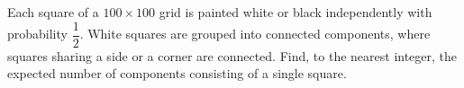 Each square of a $100\times100$ grid is painted white or black independently with probability $\dfrac12$. White squares are grouped into connected components, where squares sharing a side or a corner are connected. Find, to the nearest integer, the expected number of components consisting of a single square.

